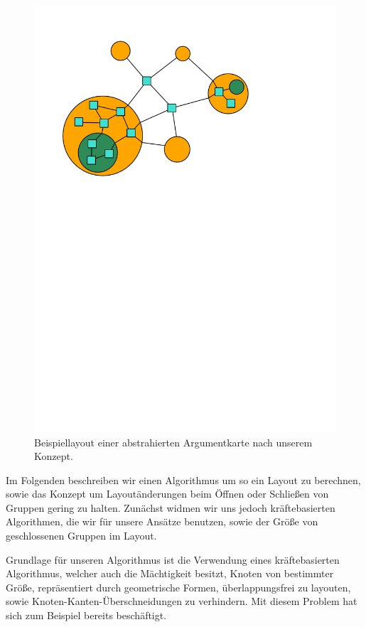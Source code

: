 \begin{figure}[h!]
\begin{center} 
  \includegraphics{Pics/Layoutbeispiel.pdf}
  \caption{Beispiellayout einer abstrahierten Argumentkarte nach unserem Konzept.}
  \label{f:Layoutbeispiel}
\end{center}
\end{figure}

Im Folgenden beschreiben wir einen Algorithmus um so ein Layout zu berechnen, 
sowie das Konzept um Layoutänderungen beim Öffnen oder Schließen von Gruppen gering zu halten.
Zunächst widmen wir uns jedoch kräftebasierten Algorithmen, die wir für unsere Ansätze benutzen, sowie der Größe von geschlossenen Gruppen im Layout.

Grundlage für unseren Algorithmus ist die Verwendung eines kräftebasierten Algorithmus, welcher auch die Mächtigkeit besitzt,
Knoten von bestimmter Größe, repräsentiert durch geometrische Formen, überlappungsfrei zu layouten, sowie Knoten-Kanten-Überschneidungen zu verhindern.
Mit diesem Problem hat sich zum Beispiel bereits  \cite{Harel:2002:DGN:1556262.1556288} beschäftigt.

